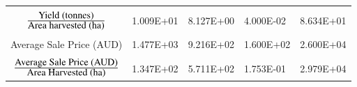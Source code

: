 \documentclass[review,12pt,authoryear]{elsarticle}
\begin{document}
\begin{linenumbers}
\begin{table}[]
\begin{tabular}{@{}cllll@{}}
          \multicolumn{1}{l}{} &  &  &  &  \\
          $\mbox{Yield (tonnes)}\over \mbox{Area harvested (ha)}$ & 1.009E+01 & 8.127E+00 & 4.000E-02 & 8.634E+01 \\
          \multicolumn{1}{l}{} &  &  &  &  \\
          {Average Sale Price (AUD)} & 1.477E+03 & 9.216E+02 & 1.600E+02 & 2.600E+04 \\
          \multicolumn{1}{l}{} &  &  &  &  \\
          $\mbox{Average Sale Price (AUD)} \over \mbox{Area Harvested (ha)}$ & 1.347E+02 & 5.711E+02 & 1.753E-01 & 2.979E+04 \\ \bottomrule
          \end{tabular}
  \end{table}


\end{linenumbers}
\end{document}
